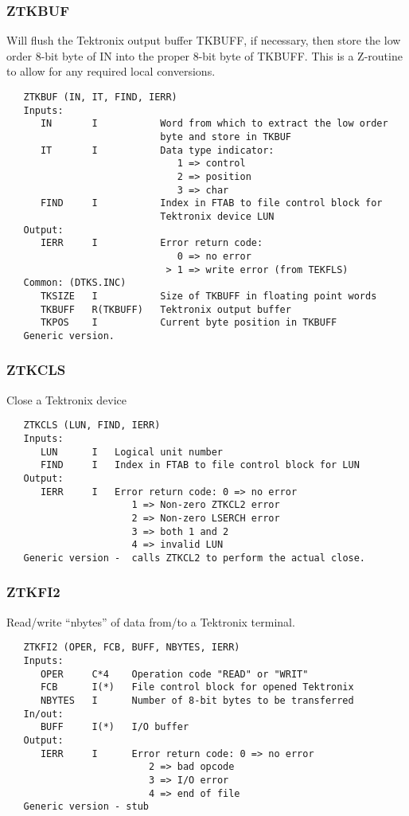 \subsubsection{ZTKBUF}
Will flush the Tektronix output buffer TKBUFF, if necessary,
then store the low order 8-bit byte of IN into the proper 8-bit byte
of TKBUFF.  This is a Z-routine to allow for any required local
conversions.
\begin{verbatim}
   ZTKBUF (IN, IT, FIND, IERR)
   Inputs:
      IN       I           Word from which to extract the low order
                           byte and store in TKBUF
      IT       I           Data type indicator:
                              1 => control
                              2 => position
                              3 => char
      FIND     I           Index in FTAB to file control block for
                           Tektronix device LUN
   Output:
      IERR     I           Error return code:
                              0 => no error
                            > 1 => write error (from TEKFLS)
   Common: (DTKS.INC)
      TKSIZE   I           Size of TKBUFF in floating point words
      TKBUFF   R(TKBUFF)   Tektronix output buffer
      TKPOS    I           Current byte position in TKBUFF
   Generic version.
\end{verbatim}

\subsubsection{ZTKCLS}
Close a Tektronix device
\begin{verbatim}
   ZTKCLS (LUN, FIND, IERR)
   Inputs:
      LUN      I   Logical unit number
      FIND     I   Index in FTAB to file control block for LUN
   Output:
      IERR     I   Error return code: 0 => no error
                      1 => Non-zero ZTKCL2 error
                      2 => Non-zero LSERCH error
                      3 => both 1 and 2
                      4 => invalid LUN
   Generic version -  calls ZTKCL2 to perform the actual close.
\end{verbatim}

\subsubsection{ZTKFI2}
Read/write ``nbytes'' of data from/to a Tektronix terminal.
\begin{verbatim}
   ZTKFI2 (OPER, FCB, BUFF, NBYTES, IERR)
   Inputs:
      OPER     C*4    Operation code "READ" or "WRIT"
      FCB      I(*)   File control block for opened Tektronix
      NBYTES   I      Number of 8-bit bytes to be transferred
   In/out:
      BUFF     I(*)   I/O buffer
   Output:
      IERR     I      Error return code: 0 => no error
                         2 => bad opcode
                         3 => I/O error
                         4 => end of file
   Generic version - stub
\end{verbatim}

